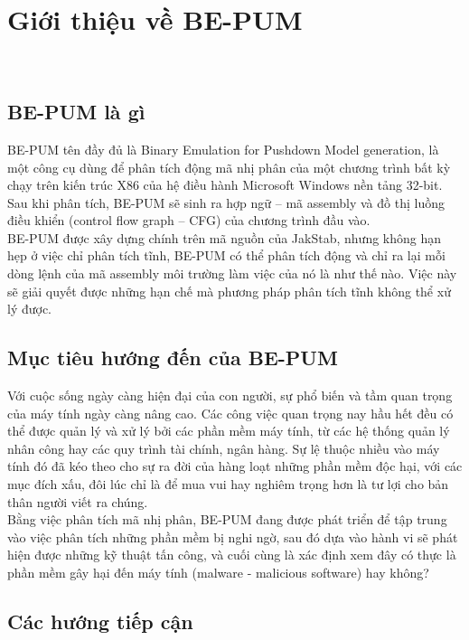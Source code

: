 

\section{Giới thiệu về BE-PUM}\

	\subsection{BE-PUM là gì}

BE-PUM tên đầy đủ là Binary Emulation for Pushdown Model generation, là một công cụ dùng để phân tích động mã nhị phân của một chương trình bất kỳ chạy trên kiến trúc X86 của hệ điều hành Microsoft Windows nền tảng 32-bit. Sau khi phân tích, BE-PUM sẽ sinh ra hợp ngữ – mã assembly và đồ thị luồng điều khiển (control flow graph – CFG) của chương trình đầu vào.\\

BE-PUM được xây dựng chính trên mã nguồn của JakStab, nhưng không hạn hẹp ở việc chỉ phân tích tĩnh, BE-PUM có thể phân tích động và chỉ ra lại mỗi dòng lệnh của mã assembly môi trường làm việc của nó là như thế nào. Việc này sẽ giải quyết được những hạn chế mà phương pháp phân tích tĩnh không thể xử lý được.

	\subsection{Mục tiêu hướng đến của BE-PUM}

Với cuộc sống ngày càng hiện đại của con người, sự phổ biến và tầm quan trọng của máy tính ngày càng nâng cao. Các công việc quan trọng nay hầu hết đều có thể được quản lý và xử lý bởi các phần mềm máy tính, từ các hệ thống quản lý nhân công hay các quy trình tài chính, ngân hàng. Sự lệ thuộc nhiều vào máy tính đó đã kéo theo cho sự ra đời của hàng loạt những phần mềm độc hại, với các mục đích xấu, đôi lúc chỉ là để mua vui hay nghiêm trọng hơn là tư lợi cho bản thân người viết ra chúng. \\

Bằng việc phân tích mã nhị phân, BE-PUM đang được phát triển để tập trung vào việc phân tích những phần mềm bị nghi ngờ, sau đó dựa vào hành vi sẽ phát hiện được những kỹ thuật tấn công, và cuối cùng là xác định xem đây có thực là phần mềm gây hại đến máy tính (malware - malicious software) hay không?

	\subsection{Các hướng tiếp cận}

